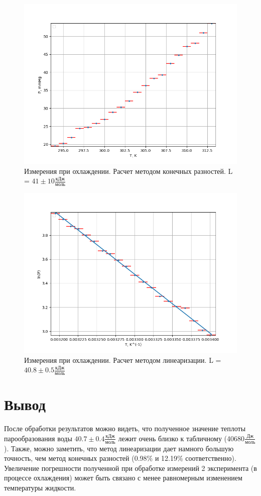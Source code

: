 \documentclass[12pt]{article}
\begin{document}
\begin{figure}[H]
	\centering
	\includegraphics[scale = 0.8]{./images/Co.png}
	\caption{Измерения при охлаждении. Расчет методом конечных разностей. L = $41 \pm 10\frac{\text{кДж}}{\text{моль}}$ }
\end{figure}

\begin{figure}[H]
	\centering
	\includegraphics[scale = 0.8]{./images/CoLin.png}
	\caption{Измерения при охлаждении. Расчет методом линеаризации. L = $40.8 \pm 0.5\frac{\text{кДж}}{\text{моль}}$ }
\end{figure}

\section{Вывод}

После обработки результатов можно видеть, что полученное значение теплоты парообразования воды $40.7 \pm 0.4\frac{\text{кДж}}{\text{моль}}$ лежит очень близко к табличному (40680$\frac{\text{Дж}}{\text{моль}}$). Также, можно заметить, что метод линеаризации дает намного большую точность, чем метод конечных разностей (0.98\% и 12.19\% соответственно). 
Увеличение погрешности полученной при обработке измерений 2 эксперимента (в процессе охлаждения) может быть связано с менее равномерным изменением температуры жидкости.
\end{document}
